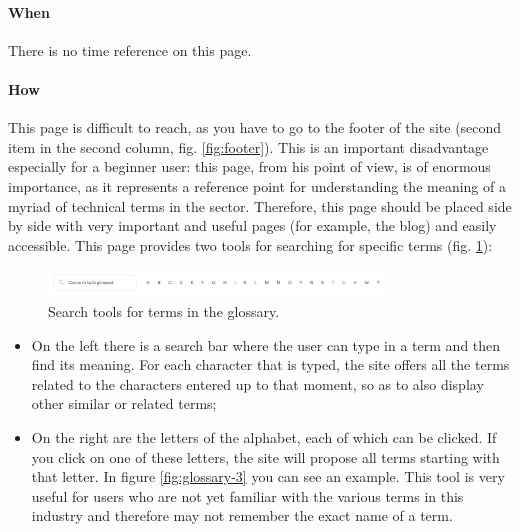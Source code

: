 \paragraph{When}

There is no time reference on this page.

\paragraph{How}

This page is difficult to reach, as you have to go to the footer of the 
site (second item in the second column, fig. \ref{fig:footer}). This is an 
important disadvantage especially for a beginner user: this page, from his 
point of view, is of enormous importance, as it represents a reference 
point for understanding the meaning of a myriad of technical terms in the 
sector. Therefore, this page should be placed side by side with very 
important and useful pages (for example, the blog) and easily accessible. 
This page provides two tools for searching for specific terms (fig. 
\ref{fig:glossary-2}):

\begin{figure}[H]
  \centering
  \includegraphics[width=0.80\textwidth]{res/images/internal-pages/glossary/glossary-2.png}
  \caption{Search tools for terms in the glossary.}
  \label{fig:glossary-2}
\end{figure}

\begin{itemize}
  \item On the left there is a search bar where the user can type in a 
  term and then find its meaning. For each character that is typed, the 
  site offers all the terms related to the characters entered up to that 
  moment, so as to also display other similar or related terms;

  \item On the right are the letters of the alphabet, each of which can be 
  clicked. If you click on one of these letters, the site will propose all 
  terms starting with that letter. In figure \ref{fig:glossary-3} you can 
  see an example. This tool is very useful for users who are not yet 
  familiar with the various terms in this industry and therefore may not 
  remember the exact name of a term.
\end{itemize}

